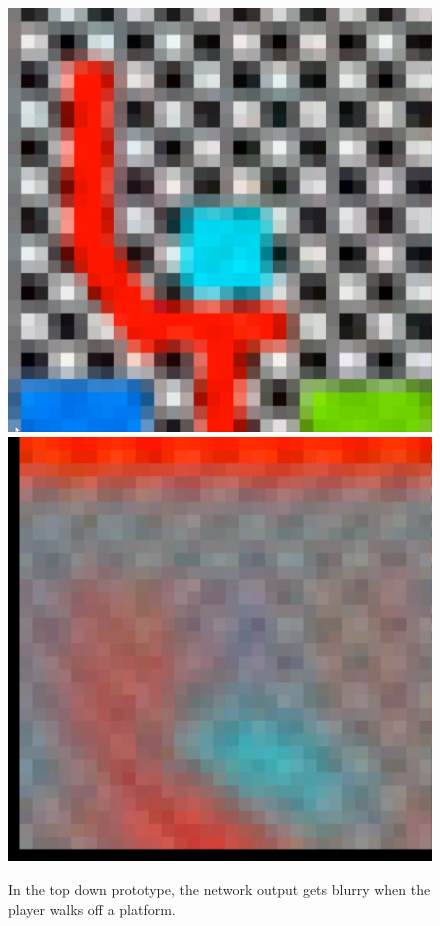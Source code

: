 \begin{figure}[p]
  \centering
  \includegraphics[width=\imgWidth]{images/workflow/TopDownOn.png} \\[\picVdist]
  \includegraphics[width=\imgWidth]{images/workflow/TopDownOff.png}
  \caption{In the top down prototype, the network output gets blurry when the player walks off a platform.}
  \label{WalkOffPlatform}
\end{figure}


